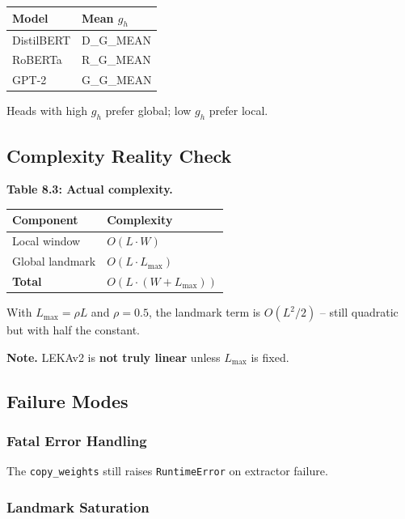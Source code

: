 \begin{table}[H]
\centering
\small
\begin{tabular}{ll}
\toprule
\textbf{Model} & \textbf{Mean $g_h$} \\
\midrule
DistilBERT & {{D\_G\_MEAN}} \\
RoBERTa & {{R\_G\_MEAN}} \\
GPT-2 & {{G\_G\_MEAN}} \\
\bottomrule
\end{tabular}
\end{table}

Heads with high $g_h$ prefer global; low $g_h$ prefer local.

\subsection{Complexity Reality Check}

\textbf{Table 8.3: Actual complexity.}

\begin{table}[H]
\centering
\small
\begin{tabular}{ll}
\toprule
\textbf{Component} & \textbf{Complexity} \\
\midrule
Local window & $O(L \cdot W)$ \\
Global landmark & $O(L \cdot L_\text{max})$ \\
\textbf{Total} & \textbf{$O(L \cdot (W + L_\text{max}))$} \\
\bottomrule
\end{tabular}
\end{table}

With $L_\text{max} = \rho L$ and $\rho = 0.5$, the landmark term is 
$O(L^2 / 2)$ -- still quadratic but with half the constant.

\textbf{Note.} LEKAv2 is \textbf{not truly linear} unless $L_\text{max}$ is fixed.

\subsection{Failure Modes}

\subsubsection{Fatal Error Handling}

The \texttt{copy\_weights} still raises \texttt{RuntimeError} on extractor failure.

\subsubsection{Landmark Saturation}

